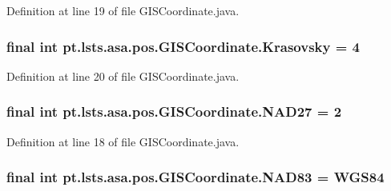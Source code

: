 Definition at line 19 of file G\+I\+S\+Coordinate.\+java.

\hypertarget{classpt_1_1lsts_1_1asa_1_1pos_1_1GISCoordinate_a20fbe0542ed7919e5c334e2ad914142b}{}
\subsubsection[{Krasovsky}]{\setlength{\rightskip}{0pt plus 5cm}final int pt.\+lsts.\+asa.\+pos.\+G\+I\+S\+Coordinate.\+Krasovsky = 4\hspace{0.3cm}{\ttfamily [static]}}\label{classpt_1_1lsts_1_1asa_1_1pos_1_1GISCoordinate_a20fbe0542ed7919e5c334e2ad914142b}


Definition at line 20 of file G\+I\+S\+Coordinate.\+java.

\hypertarget{classpt_1_1lsts_1_1asa_1_1pos_1_1GISCoordinate_ac814b047b2b84a555eb92bc445390689}{}
\subsubsection[{N\+A\+D27}]{\setlength{\rightskip}{0pt plus 5cm}final int pt.\+lsts.\+asa.\+pos.\+G\+I\+S\+Coordinate.\+N\+A\+D27 = 2\hspace{0.3cm}{\ttfamily [static]}}\label{classpt_1_1lsts_1_1asa_1_1pos_1_1GISCoordinate_ac814b047b2b84a555eb92bc445390689}


Definition at line 18 of file G\+I\+S\+Coordinate.\+java.

\hypertarget{classpt_1_1lsts_1_1asa_1_1pos_1_1GISCoordinate_a83bb3a9385e7da0d7df20bf556b8c97c}{}
\subsubsection[{N\+A\+D83}]{\setlength{\rightskip}{0pt plus 5cm}final int pt.\+lsts.\+asa.\+pos.\+G\+I\+S\+Coordinate.\+N\+A\+D83 = {\bf W\+G\+S84}\hspace{0.3cm}{\ttfamily [static]}}\label{classpt_1_1lsts_1_1asa_1_1pos_1_1GISCoordinate_a83bb3a9385e7da0d7df20bf556b8c97c}


